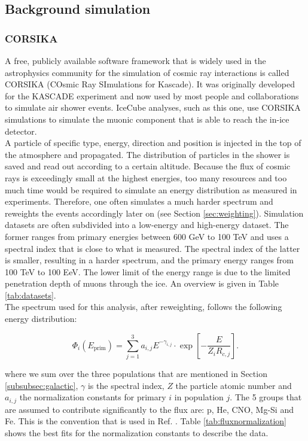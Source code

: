 \subsection{Background simulation}
\subsubsection{CORSIKA}
A free, publicly available software framework that is widely used in the astrophysics community for the simulation of cosmic ray interactions is called CORSIKA  (COsmic Ray SImulations for Kascade). It was originally developed for the KASCADE experiment and now used by most people and collaborations to simulate air shower events. IceCube analyses, such as this one, use CORSIKA simulations to simulate the muonic component that is able to reach the in-ice detector.\\

\noindent A particle of specific type, energy, direction and position is injected in the top of the atmosphere and propagated. The distribution of particles in the shower is saved and read out according to a certain altitude. Because the flux of cosmic rays is exceedingly small at the highest energies, too many resources and too much time would be required to simulate an energy distribution as measured in experiments. Therefore, one often simulates a much harder spectrum and reweights the events accordingly later on (see Section \ref{sec:weighting}). Simulation datasets are often subdivided into a low-energy and high-energy dataset. The former ranges from primary energies between 600 GeV to 100 TeV and uses a spectral index that is close to what is measured. The spectral index of the latter is smaller, resulting in a harder spectrum, and the primary energy ranges from 100 TeV to 100 EeV. The lower limit of the energy range is due to the limited penetration depth of muons through the ice. An overview is given in Table \ref{tab:datasets}.\\

\noindent The spectrum used for this analysis, after reweighting, follows the following energy distribution:

\begin{equation}
\label{eq:gaisser}
\Phi_i \left(E_{\textrm{prim}}\right) = \sum^3_{j=1} a_{i,j} E^{-\gamma_{i,j}} \cdot \exp \left[- \frac{E}{Z_i R_{c,j}}\right].
\end{equation}

\noindent where we sum over the three populations that are mentioned in Section \ref{subsubsec:galactic}, $\gamma$ is the spectral index, $Z$ the particle atomic number and $a_{i,j}$ the normalization constants for primary $i$ in population $j$. The 5 groups that are assumed to contribute significantly to the flux are: p, He, CNO, Mg-Si and Fe. This is the convention that is used in Ref. \cite{Gaisser:2013bla}. Table \ref{tab:fluxnormalization} shows the best fits for the normalization constants to describe the data.

